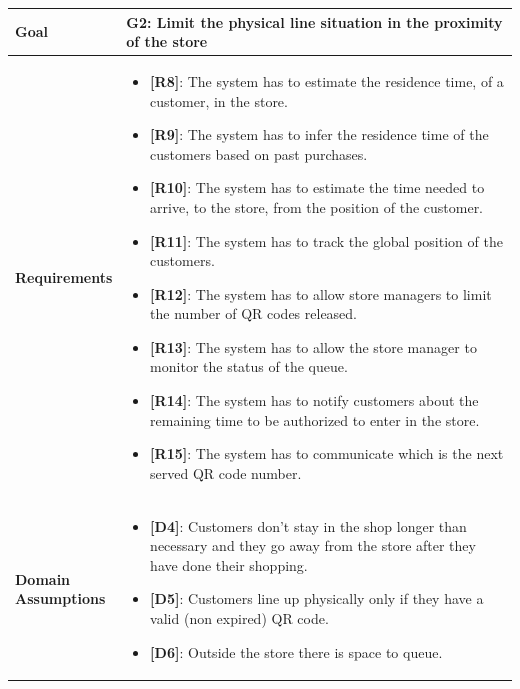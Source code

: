 \begin{table}[H]
    \centering
    \begin{tabular}{| m{} | m{} |}
        \hline
        \textbf{Goal} &
        \textbf{G2: Limit the physical line situation in the proximity of the store} \\
        \hline
        \textbf{Requirements} &
        \begin{itemize}
            \item {\textbf{[R8]}}: The system has to estimate the residence time, of a customer, in the store.
            \item {\textbf{[R9]}}: The system has to infer the residence time of the customers based on past purchases.
            \item {\textbf{[R10]}}: The system has to estimate the time needed to arrive, to the store, from the position of the customer.
            \item {\textbf{[R11]}}: The system has to track the global position of the customers.
            \item {\textbf{[R12]}}: The system has to allow store managers to limit the number of QR codes released.
            \item {\textbf{[R13]}}: The system has to allow the store manager to monitor the status of the queue.
            \item {\textbf{[R14]}}: The system has to notify customers about the remaining time to be authorized to enter in the store.
            \item {\textbf{[R15]}}: The system has to communicate which is the next served QR code number.
        \end{itemize} \\
        \hline
        \shortstack[l]{\textbf{Domain} \\ \textbf{Assumptions}} &
        \begin{itemize}
            \item {\textbf{[D4]}}: Customers don't stay in the shop longer than necessary and they go away from the store after they have done their shopping.
            \item {\textbf{[D5]}}: Customers line up physically only if they have a valid (non expired) QR code.
            \item {\textbf{[D6]}}: Outside the store there is space to queue.
        \end{itemize} \\
        \hline
    \end{tabular}
\end{table}

